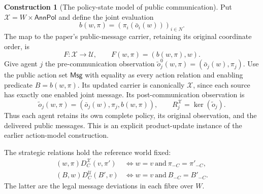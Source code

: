 \documentclass[11pt,a4paper]{article}
\numberwithin{equation}{section}
\theoremstyle{definition}
\newtheorem{construction}[construction]{Construction}
\theoremstyle{remark}
\theoremstyle{plain}
\begin{document}
\begin{construction}[The policy-state model of public communication]
\label{con:egt-announcement-policy-model}
Put $\mathcal X=W\times\mathsf{AnnPol}$ and define the joint evaluation
\[
 b(w,\pi)=(\pi_i(\bar o_i(w)))_{i\in N}.
\]
The map to the paper's public-message carrier, retaining its original
coordinate order, is
\[
 F:\mathcal X\to\mathcal U,
 \qquad F(w,\pi)=(b(w,\pi),w).
\]
Give agent $j$ the pre-communication observation
$\widetilde o_j^0(w,\pi)=(\bar o_j(w),\pi_j)$. Use the public action set
$\mathsf{Msg}$ with equality as every action relation and enabling predicate
$B=b(w,\pi)$. Its updated carrier is canonically $\mathcal X$, since each
source has exactly one enabled joint message. Its post-communication
observation is
\[
 \widetilde o_j(w,\pi)
    =(\bar o_j(w),\pi_j,b(w,\pi)),
 \qquad R_j^{\mathcal X}=\ker(\widetilde o_j).
\]
Thus each agent retains its own complete policy, its original observation,
and the delivered public messages. This is an explicit product-update
instance of the earlier action-model construction.

The strategic relations hold the reference world fixed:
\[
 \begin{aligned}
 (w,\pi)D_C^{\mathcal X}(v,\pi')
   &\iff w=v\ \text{and}\ \pi_{-C}=\pi'_{-C},\\
 (B,w)D_C^{\mathcal U}(B',v)
   &\iff w=v\ \text{and}\ B_{-C}=B'_{-C}.
 \end{aligned}
\]
The latter are the legal message deviations in each fibre over $W$.
\end{construction}
\end{document}
